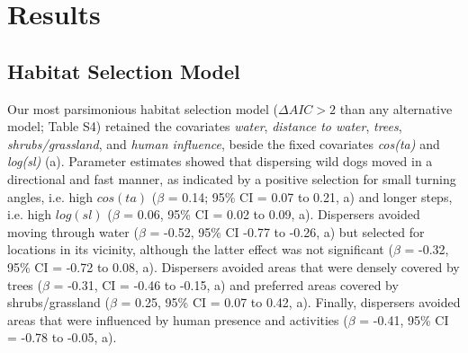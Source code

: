 \documentclass[abstract=on,10pt,a4paper,bibliography=totocnumbered]{article}
\begin{document}
\section{Results}
\subsection{Habitat Selection Model}
Our most parsimonious habitat selection model (\(\Delta AIC > 2\) than any
alternative model; Table S4) retained the covariates \textit{water},
\textit{distance to water}, \textit{trees}, \textit{shrubs/grassland}, and
\textit{human influence}, beside the fixed covariates \textit{cos(ta)} and
\textit{log(sl)} (a). Parameter estimates showed that
dispersing wild dogs moved in a directional and fast manner, as indicated by a
positive selection for small turning angles, i.e. high \(cos(ta)\) (\(\beta\) =
0.14; 95\% CI = 0.07 to 0.21, a) and longer steps,
i.e. high \(log(sl)\) (\(\beta\) = 0.06, 95\% CI = 0.02 to 0.09,
a). Dispersers avoided moving through water (\(\beta\)
= -0.52, 95\% CI -0.77 to -0.26, a) but selected for
locations in its vicinity, although the latter effect was not significant
(\(\beta\) = -0.32, 95\% CI = -0.72 to 0.08, a).
Dispersers avoided areas that were densely covered by trees (\(\beta\) = -0.31,
CI = -0.46 to -0.15, a) and preferred areas covered by
shrubs/grassland (\(\beta\) = 0.25, 95\% CI = 0.07 to 0.42,
a). Finally, dispersers avoided areas that were
influenced by human presence and activities (\(\beta\) = -0.41, 95\% CI = -0.78
to -0.05, a).
\end{document}
